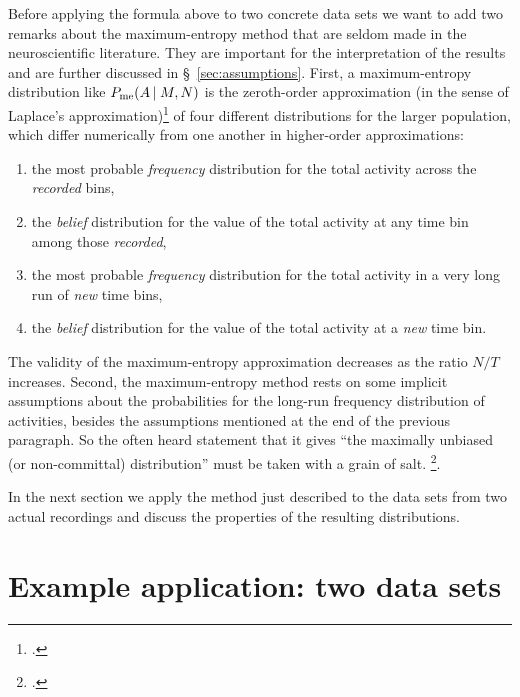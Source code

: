 \documentclass[\ifafour a4paper,12pt,\else a5paper,10pt,\fi%
onecolumn,oneside,article,%
british%
]{memoir}
\theoremstyle{remark}
\theoremstyle{innote}
\newcommand*{\citep}{\footcites}
\renewcommand*{\le}{\leqslant}%
\renewcommand*{\|}{\nonscript\,\vert\nonscript\;\mathopen{}}
\newcommand*{\sect}{\S}%
\newcommand*{\chap}{ch.}%
\newcommand*{\puzzle}{{\fontencoding{U}\fontfamily{fontawesometwo}\selectfont\symbol{225}}}
\newcommand{\mynote}[1]{ {\color{notecolour}\puzzle\ #1}}
\newcommand*{\yAv}{A}
\newcommand*{\yFF}{F}
\newcommand*{\yA}{\yAv}%
\newcommand*{\yH}{\varIota}
\newcommand*{\ynuu}{\nu}
\newcommand*{\px}{P_{\text{me}}}
\begin{document}
Before applying the formula above to two concrete data sets we want to add
two remarks about the maximum-entropy method that are seldom made in the
neuroscientific literature. They are important for the interpretation of
the results and are further discussed in \sect~\ref{sec:assumptions}.
First, a maximum-entropy distribution like $\px(\yA \| M, N)$ is the
zeroth-order approximation (in the sense of Laplace's
approximation)\citep[\chap~4]{debruijn1958_r1961}{tierneyetal1986,strawderman2000}
of four different distributions for the larger population, which differ
numerically from one another in higher-order approximations:
\begin{enumerate}[label=(\roman*)]
\item the most probable \emph{frequency} distribution for the total
  activity across the \emph{recorded} bins, %
\item the \emph{belief} distribution for the value of the total
  activity at any time bin among those \emph{recorded},
\item the most probable \emph{frequency} distribution for the total
  activity in a very long run of \emph{new} time bins, %
\item the \emph{belief} distribution for the value of the total
  activity at a \emph{new} time bin.
\end{enumerate}
The validity of the maximum-entropy approximation decreases as the ratio
$N/T$ increases. Second, the maximum-entropy
method %
rests on some implicit assumptions about the probabilities for the long-run
frequency distribution of activities, besides the assumptions mentioned at
the end of the previous paragraph. So the often heard statement that it
gives \enquote{the maximally unbiased (or non-committal) distribution} must
be taken with a grain of salt. \citep[\mynote{move to
  sect}]{jaynes1986d_r1996,portamana2009,portamana2017}.



\bigskip

In the next section we apply the method just described to the data sets
from two actual recordings and discuss the properties of the resulting
distributions.

\section{Example application: two data sets}
\label{sec:application}
\end{document}
